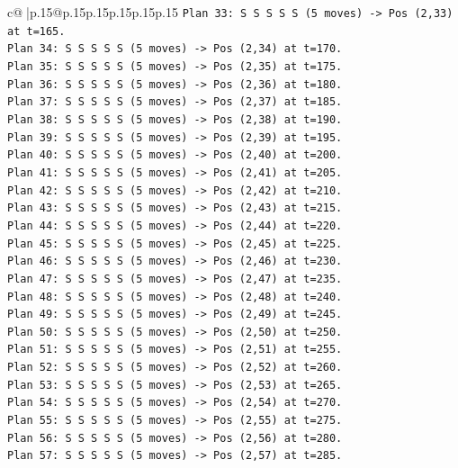 \documentclass{article}
\begin{document}
{\begin{supertabular}{c@{$\;$}|p{.15\linewidth}@{}p{.15\linewidth}p{.15\linewidth}p{.15\linewidth}p{.15\linewidth}p{.15\linewidth}}
{{{\texttt{Plan 33: S S S S S (5 moves) {-}> Pos (2,33) at t=165.} \\
\texttt{Plan 34: S S S S S (5 moves) {-}> Pos (2,34) at t=170.} \\
\texttt{Plan 35: S S S S S (5 moves) {-}> Pos (2,35) at t=175.} \\
\texttt{Plan 36: S S S S S (5 moves) {-}> Pos (2,36) at t=180.} \\
\texttt{Plan 37: S S S S S (5 moves) {-}> Pos (2,37) at t=185.} \\
\texttt{Plan 38: S S S S S (5 moves) {-}> Pos (2,38) at t=190.} \\
\texttt{Plan 39: S S S S S (5 moves) {-}> Pos (2,39) at t=195.} \\
\texttt{Plan 40: S S S S S (5 moves) {-}> Pos (2,40) at t=200.} \\
\texttt{Plan 41: S S S S S (5 moves) {-}> Pos (2,41) at t=205.} \\
\texttt{Plan 42: S S S S S (5 moves) {-}> Pos (2,42) at t=210.} \\
\texttt{Plan 43: S S S S S (5 moves) {-}> Pos (2,43) at t=215.} \\
\texttt{Plan 44: S S S S S (5 moves) {-}> Pos (2,44) at t=220.} \\
\texttt{Plan 45: S S S S S (5 moves) {-}> Pos (2,45) at t=225.} \\
\texttt{Plan 46: S S S S S (5 moves) {-}> Pos (2,46) at t=230.} \\
\texttt{Plan 47: S S S S S (5 moves) {-}> Pos (2,47) at t=235.} \\
\texttt{Plan 48: S S S S S (5 moves) {-}> Pos (2,48) at t=240.} \\
\texttt{Plan 49: S S S S S (5 moves) {-}> Pos (2,49) at t=245.} \\
\texttt{Plan 50: S S S S S (5 moves) {-}> Pos (2,50) at t=250.} \\
\texttt{Plan 51: S S S S S (5 moves) {-}> Pos (2,51) at t=255.} \\
\texttt{Plan 52: S S S S S (5 moves) {-}> Pos (2,52) at t=260.} \\
\texttt{Plan 53: S S S S S (5 moves) {-}> Pos (2,53) at t=265.} \\
\texttt{Plan 54: S S S S S (5 moves) {-}> Pos (2,54) at t=270.} \\
\texttt{Plan 55: S S S S S (5 moves) {-}> Pos (2,55) at t=275.} \\
\texttt{Plan 56: S S S S S (5 moves) {-}> Pos (2,56) at t=280.} \\
\texttt{Plan 57: S S S S S (5 moves) {-}> Pos (2,57) at t=285.} \\
}}}
\end{supertabular}}
\end{document}
